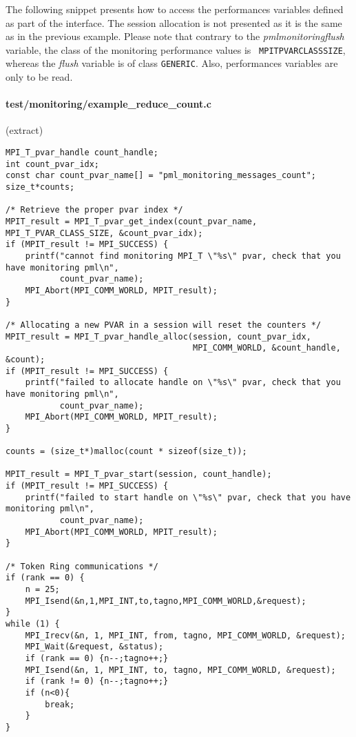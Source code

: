 The following snippet presents how to access the performances
variables defined as part of the \mpit{} interface. The session
allocation is not presented as it is the same as in the previous
example. Please note that contrary to the {\it
  pml\brkunds{}monitoring\brkunds{}flush} variable, the class of the
monitoring performance values is {\tt
  MPI\brkunds{}T\brkunds{}PVAR\brkunds{}CLASS\brkunds{}SIZE}, whereas
the {\it flush} variable is of class {\tt GENERIC}. Also, performances
variables are only to be read.

\paragraph{test/monitoring/example\_reduce\_count.c} (extract)

\begin{verbatim}
MPI_T_pvar_handle count_handle;
int count_pvar_idx;
const char count_pvar_name[] = "pml_monitoring_messages_count";
size_t*counts;

/* Retrieve the proper pvar index */
MPIT_result = MPI_T_pvar_get_index(count_pvar_name, MPI_T_PVAR_CLASS_SIZE, &count_pvar_idx);
if (MPIT_result != MPI_SUCCESS) {
    printf("cannot find monitoring MPI_T \"%s\" pvar, check that you have monitoring pml\n",
           count_pvar_name);
    MPI_Abort(MPI_COMM_WORLD, MPIT_result);
}

/* Allocating a new PVAR in a session will reset the counters */
MPIT_result = MPI_T_pvar_handle_alloc(session, count_pvar_idx,
                                      MPI_COMM_WORLD, &count_handle, &count);
if (MPIT_result != MPI_SUCCESS) {
    printf("failed to allocate handle on \"%s\" pvar, check that you have monitoring pml\n",
           count_pvar_name);
    MPI_Abort(MPI_COMM_WORLD, MPIT_result);
}

counts = (size_t*)malloc(count * sizeof(size_t));

MPIT_result = MPI_T_pvar_start(session, count_handle);
if (MPIT_result != MPI_SUCCESS) {
    printf("failed to start handle on \"%s\" pvar, check that you have monitoring pml\n",
           count_pvar_name);
    MPI_Abort(MPI_COMM_WORLD, MPIT_result);
}

/* Token Ring communications */
if (rank == 0) {
    n = 25;
    MPI_Isend(&n,1,MPI_INT,to,tagno,MPI_COMM_WORLD,&request);
}
while (1) {
    MPI_Irecv(&n, 1, MPI_INT, from, tagno, MPI_COMM_WORLD, &request);
    MPI_Wait(&request, &status);
    if (rank == 0) {n--;tagno++;}
    MPI_Isend(&n, 1, MPI_INT, to, tagno, MPI_COMM_WORLD, &request);
    if (rank != 0) {n--;tagno++;}
    if (n<0){
        break;
    }
}


\end{verbatim}
